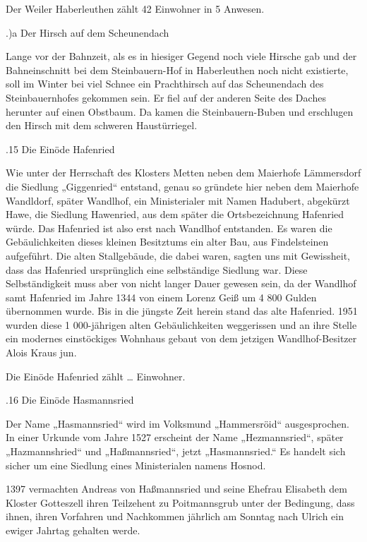 \documentclass{book}
\begin{document}
Der Weiler Haberleuthen zählt 42 Einwohner in 5 Anwesen.

.)a Der Hirsch auf dem Scheunendach

Lange vor der Bahnzeit, als es in hiesiger Gegend noch viele Hirsche gab und der
Bahneinschnitt bei dem Steinbauern-Hof in Haberleuthen noch nicht existierte,
soll im Winter bei viel Schnee ein Prachthirsch auf das Scheunendach des
Steinbauernhofes gekommen sein. Er fiel auf der anderen Seite des Daches
herunter auf einen Obstbaum. Da kamen die Steinbauern-Buben und erschlugen den
Hirsch mit dem schweren Haustürriegel.

.15 Die Einöde Hafenried

Wie unter der Herrschaft des Klosters Metten neben dem Maierhofe Lämmersdorf die
Siedlung „Giggenried“ entstand, genau so gründete hier neben dem Maierhofe
Wandldorf, später Wandlhof, ein Ministerialer mit Namen Hadubert, abgekürzt
Hawe, die Siedlung Hawenried, aus dem später die Ortsbezeichnung Hafenried
würde. Das Hafenried ist also erst nach Wandlhof entstanden. Es waren die
Gebäulichkeiten dieses kleinen Besitztums ein alter Bau, aus Findelsteinen
aufgeführt. Die alten Stallgebäude, die dabei waren, sagten uns mit Gewissheit,
dass das Hafenried ursprünglich eine selbständige Siedlung war. Diese
Selbständigkeit muss aber von nicht langer Dauer gewesen sein, da der Wandlhof
samt Hafenried im Jahre 1344 von einem Lorenz Geiß um 4 800 Gulden übernommen
wurde. Bis in die jüngste Zeit herein stand das alte Hafenried. 1951 wurden
diese 1 000-jährigen alten Gebäulichkeiten weggerissen und an ihre Stelle ein
modernes einstöckiges Wohnhaus gebaut von dem jetzigen Wandlhof-Besitzer Alois
Kraus jun.

Die Einöde Hafenried zählt … Einwohner.

.16 Die Einöde Hasmannsried

Der Name „Hasmannsried“ wird im Volksmund „Hammersröid“ ausgesprochen. In einer
Urkunde vom Jahre 1527 erscheint der Name „Hezmannsried“, später „Hazmannshried“
und „Haßmannsried“, jetzt „Hasmannsried.“ Es handelt sich sicher um eine
Siedlung eines Ministerialen namens Hosnod.

1397 vermachten Andreas von Haßmannsried und seine Ehefrau Elisabeth dem Kloster
Gotteszell ihren Teilzehent zu Poitmannsgrub unter der Bedingung, dass ihnen,
ihren Vorfahren und Nachkommen jährlich am Sonntag nach Ulrich ein ewiger
Jahrtag gehalten werde.
\end{document}
